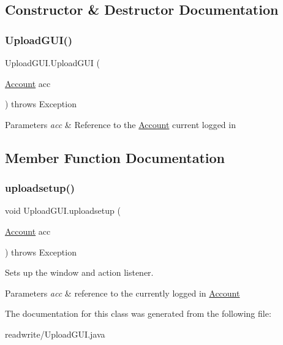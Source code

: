 \subsection{Constructor \& Destructor Documentation}
\mbox{\label{class_upload_g_u_i_a19f2e3a86156809d4497a210b508ede2}} 
\subsubsection{\texorpdfstring{Upload\+G\+U\+I()}{UploadGUI()}}
{\footnotesize\ttfamily Upload\+G\+U\+I.\+Upload\+G\+UI (\begin{DoxyParamCaption}\item[{\hyperlink{class_account}{Account}}]{acc }\end{DoxyParamCaption}) throws Exception}


\begin{DoxyParams}{Parameters}
{\em acc} & Reference to the \hyperlink{class_account}{Account} current logged in \\
\hline
\end{DoxyParams}


\subsection{Member Function Documentation}
\mbox{\label{class_upload_g_u_i_a4f67dc6bcb1ae96c2b7a148918348075}} 
\subsubsection{\texorpdfstring{uploadsetup()}{uploadsetup()}}
{\footnotesize\ttfamily void Upload\+G\+U\+I.\+uploadsetup (\begin{DoxyParamCaption}\item[{\hyperlink{class_account}{Account}}]{acc }\end{DoxyParamCaption}) throws Exception}



Sets up the window and action listener. 


\begin{DoxyParams}{Parameters}
{\em acc} & reference to the currently logged in \hyperlink{class_account}{Account} \\
\hline
\end{DoxyParams}


The documentation for this class was generated from the following file\+:\begin{DoxyCompactItemize}
\item 
readwrite/Upload\+G\+U\+I.\+java\end{DoxyCompactItemize}
